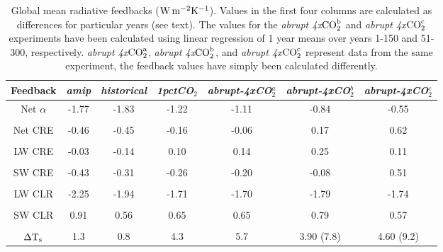 \documentclass[draft]{agujournal2019}
\begin{document}
\begin{table}
\begin{center}
\caption{Global mean radiative feedbacks ($\rm{W\, m^{-2} K^{-1}}$).  Values in the first four columns are calculated as differences for 
particular years (see text).  The values for the \textit{abrupt 4x$\rm{CO}_2^{b}$} and  \textit{abrupt 4x$\rm{CO}_2^{c}$} experiments
have been calculated using linear regression of 1 year means over years 1-150 and 51-300, respectively.  
\textit{abrupt 4x$\rm{CO}_2^{a}$}, \textit{abrupt 4x$\rm{CO}_2^{b}$}, and \textit{abrupt 4x$\rm{CO}_2^{c}$} represent data from the same experiment, the feedback values have simply been calculated differently.
}
    \begin{tabular}{*{7}{c}}
    \hline
    \hline
 Feedback     &  \textit{amip }  & \textit{historical}   &  \textit{1pctCO$_2$} & \textit{abrupt-4xCO$_2^{a}$} & \textit{abrupt-4xCO$_2^{b}$} & \textit{abrupt-4xCO$_2^{c}$}  \\ \hline
    Net $\alpha$    & -1.77      &   -1.83      &  -1.22          &  -1.11    &  -0.84   &   -0.55              \\ 
    \\
    Net CRE  &    -0.46            &   -0.45       &  -0.16          & -0.06   & 0.17      &   0.62         \\  
    \\
    LW CRE    &   -0.03           &   -0.14        &  0.10            & 0.14   &  0.25        & 0.11          \\  
    \\
    SW CRE  &     -0.43             &    -0.31       &  -0.26            & -0.20    &  -0.08      &  0.51         \\  
    \\
    LW CLR   &     -2.25             &    -1.94       &  -1.71            & -1.70    &   -1.79      & -1.74        \\  
    \\
    SW CLR  &      0.91            &     0.56        & 0.65              & 0.65    &    0.79         & 0.57          \\  
    \\
    $\Delta \rm{T}_s$     &     1.3     & 0.8        &  4.3           & 5.7     &   3.90 (7.8)        &   4.60 (9.2)         \\  \hline

    \end{tabular}\par
    \label{tab:lambda_AOGCM}
\end{center}
\end{table}
\end{document}
